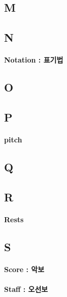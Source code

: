 \documentclass[12pt, a4paper, oneside]{book}
\begin{document}
	\subsection{M}


	\subsection{N}

\paragraph{Notation : 표기법}


	\subsection{O}

	\subsection{P}


	\paragraph{pitch}


	\subsection{Q}

	\subsection{R}


\paragraph{Rests}

	\subsection{S}

\paragraph{Score : 악보}

\paragraph{Staff : 오선보}
\end{document}
